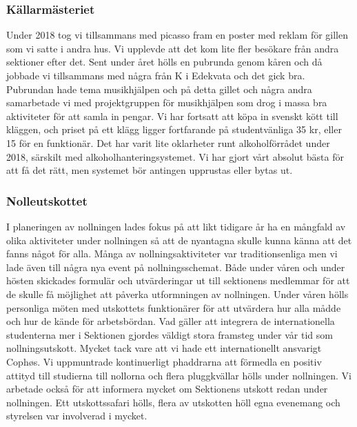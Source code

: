 \documentclass[../_main/handlingar.tex]{subfiles}
\begin{document}
\subsubsection*{Källarmästeriet}

Under 2018 tog vi tillsammans med picasso fram en poster med reklam för gillen som vi satte i andra
hus. Vi upplevde att det kom lite fler besökare från andra sektioner efter det. Sent under året hölls
en pubrunda genom kåren och då jobbade vi tillsammans med några från K i Edekvata och det gick
bra. Pubrundan hade tema musikhjälpen och på detta gillet och några andra samarbetade vi med
projektgruppen för musikhjälpen som drog i massa bra aktiviteter för att samla in pengar.
Vi har fortsatt att köpa in svenskt kött till kläggen, och priset på ett klägg ligger fortfarande på
studentvänliga 35 kr, eller 15 för en funktionär.
Det har varit lite oklarheter runt alkoholförrådet under 2018, särskilt med alkoholhanteringsystemet.
Vi har gjort vårt absolut bästa för att få det rätt, men systemet bör antingen upprustas eller bytas ut.

\newpage

\subsubsection*{Nolleutskottet}

I planeringen av nollningen lades fokus på att likt tidigare år ha en mångfald av olika aktiviteter under
nollningen så att de nyantagna skulle kunna känna att det fanns något för alla. Många av
nollningsaktiviteter var traditionsenliga men vi lade även till några nya event på nollningsschemat.
Både under våren och under hösten skickades formulär och utvärderingar ut till sektionens
medlemmar för att de skulle få möjlighet att påverka utformningen av nollningen. Under våren hölls
personliga möten med utskottets funktionärer för att utvärdera hur alla mådde och hur de kände för
arbetsbördan.
Vad gäller att integrera de internationella studenterna mer i Sektionen gjordes väldigt stora framsteg
under vår tid som nollningsutskott. Mycket tack vare att vi hade ett internationellt ansvarigt Cophøs.
Vi uppmuntrade kontinuerligt phaddrarna att förmedla en positiv attityd till studierna till nollorna
och flera pluggkvällar hölls under nollningen. Vi arbetade också för att informera mycket om
Sektionens utskott redan under nollningen. Ett utskottssafari hölls, flera av utskotten höll egna
evenemang och styrelsen var involverad i mycket.
\end{document}
